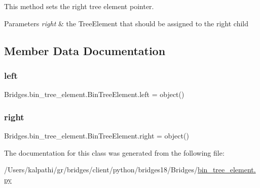 This method sets the right tree element pointer. 


\begin{DoxyParams}{Parameters}
{\em right} & the Tree\+Element that should be assigned to the right child \\
\hline
\end{DoxyParams}


\subsection{Member Data Documentation}
\mbox{\label{class_bridges_1_1bin__tree__element_1_1_bin_tree_element_a1e8797babdfccd26560b34c3971f95d7}} 
\subsubsection{\texorpdfstring{left}{left}}
{\footnotesize\ttfamily Bridges.\+bin\+\_\+tree\+\_\+element.\+Bin\+Tree\+Element.\+left = object()\hspace{0.3cm}{\ttfamily [static]}}

\mbox{\label{class_bridges_1_1bin__tree__element_1_1_bin_tree_element_a3ba9d7279bf056e6c7d50aaa5d103d49}} 
\subsubsection{\texorpdfstring{right}{right}}
{\footnotesize\ttfamily Bridges.\+bin\+\_\+tree\+\_\+element.\+Bin\+Tree\+Element.\+right = object()\hspace{0.3cm}{\ttfamily [static]}}



The documentation for this class was generated from the following file\+:\begin{DoxyCompactItemize}
\item 
/\+Users/kalpathi/gr/bridges/client/python/bridges18/\+Bridges/\mbox{\hyperlink{bin__tree__element_8py}{bin\+\_\+tree\+\_\+element.\+py}}\end{DoxyCompactItemize}
